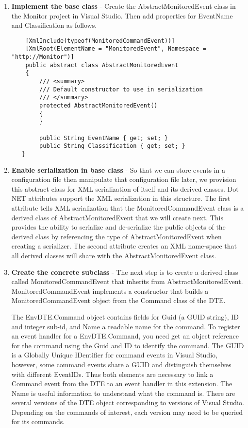 \begin{enumerate}
\item {\bf Implement the base class} - 
Create the AbstractMonitoredEvent class in the Monitor project in Visual Studio.  Then add properties for EventName and Classification as follows.

\begin{lstlisting}
    [XmlInclude(typeof(MonitoredCommandEvent))]
    [XmlRoot(ElementName = "MonitoredEvent", Namespace = "http://Monitor")]
    public abstract class AbstractMonitoredEvent
    {
        /// <summary>
        /// Default constructor to use in serialization
        /// </summary>
        protected AbstractMonitoredEvent()
        {
        }

        public String EventName { get; set; }
        public String Classification { get; set; }
   }
\end{lstlisting}

\item {\bf Enable serialization in base class} - 
So that we can store events in a configuration file then manipulate that configuration file later, we provision this abstract class for XML serialization of itself and its derived classes.  Dot NET attributes support the XML serialization in this structure.  The first attribute tells XML serialization that the MonitoredCommandEvent class is a derived class of AbstractMonitoredEvent that we will create next.  This provides the ability to serialize and de-serialize the public objects of the derived class by referencing the type of AbstractMonitoredEvent when creating a serializer.  The second attribute creates an XML name-space that all derived classes will share with the AbstractMonitoredEvent class.

\item {\bf Create the concrete subclass} - 
The next step is to create a derived class called MonitoredCommandEvent that inherits from AbstractMonitoredEvent.  MonitoredCommandEvent implements a constructor that builds a MonitoredCommandEvent object from the Command class of the DTE.

The EnvDTE.Command object contains fields for Guid (a GUID string), ID and integer sub-id, and Name a readable name for the command.  To register an event handler for a EnvDTE.Command, you need get an object reference for the command using the Guid and ID to identify the command.  The GUID is  a Globally Unique IDentifier for command events in Visual Studio, however, some command events share a GUID and distinguish themselves with different EventIDs. Thus both elements are necessary to link a Command event from the DTE to an event handler in this extension.  The Name is useful information to understand what the command is.    There are several versions of the DTE object corresponding to versions of Visual Studio.  Depending on the commands of interest, each version may need to be queried for its commands.  


\end{enumerate}
